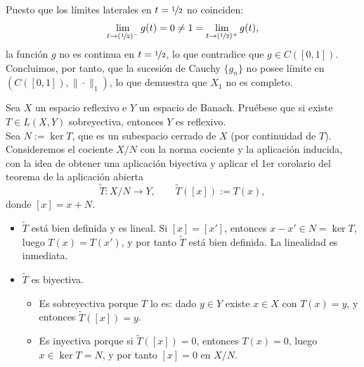 \documentclass[12pt]{article}
\begin{document}
\begin{ejercicio}[2 puntos]
\begin{enumerate}[label=\alph*)]
                Puesto que los límites laterales en $t = \nicefrac{1}{2}$ no coinciden:
                \begin{equation*}
                    \lim_{t \to (\nicefrac{1}{2})^-} g(t) = 0 \neq 1 = \lim_{t \to (\nicefrac{1}{2})^+} g(t),
                \end{equation*}
                la función $g$ no es continua en $t = \nicefrac{1}{2}$, lo que contradice que $g \in C([0, 1])$. Concluimos, por tanto, que la sucesión de Cauchy $\{g_n\}$ no posee límite en $(C([0, 1]), \|\cdot\|_1)$, lo que demuestra que $X_1$ no es completo.
        \end{enumerate}
    \end{ejercicio}
    \newpage
    
    \begin{ejercicio}[2 puntos]
         Sea $X$ un espacio reflexivo e $Y$ un espacio de Banach. Pruébese que si existe $T\in L(X,Y)$ sobreyectiva, entonces $Y$ es reflexivo.\\

         Sea $N:=\ker T$, que es un subespacio cerrado de $X$ (por continuidad de $T$).
        Consideremos el cociente $X/N$ con la norma cociente y la aplicación inducida, con la idea de obtener una aplicación biyectiva y aplicar el 1er corolario del teorema de la aplicación abierta
        \begin{equation*}
        \widetilde{T}:X/N \longrightarrow Y,
        \qquad \widetilde{T}([x]) := T(x),
        \end{equation*}
        donde $[x]=x+N$.

        \begin{itemize}
            \item $\widetilde{T}$ está bien definida y es lineal. Si $[x]=[x']$, entonces $x-x'\in N=\ker T$, luego $T(x)=T(x')$, y por tanto $\widetilde{T}$ está bien definida. La linealidad es inmediata.

            \item $\widetilde{T}$ es biyectiva.
                \begin{itemize}
                    \item Es sobreyectiva porque $T$ lo es: dado $y\in Y$ existe $x\in X$ con $T(x)=y$,
                    y entonces $\widetilde{T}([x])=y$.
                    \item Es inyectiva porque si $\widetilde{T}([x])=0$, entonces $T(x)=0$,
                    luego $x\in \ker T=N$, y por tanto $[x]=0$ en $X/N$.
                \end{itemize}


\end{itemize}
\end{ejercicio}
\end{document}
